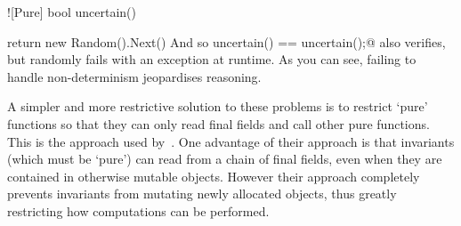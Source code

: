 \Q![Pure] bool uncertain() {return new Random().Next() %
And so \Q@assert uncertain() == uncertain();@ also verifies, but randomly fails with an exception at runtime.
As you can see, failing to handle non-determinism jeopardises reasoning.

A simpler and more restrictive solution to these problems is to restrict `pure' functions so that they can only read final fields and call other pure functions. This is the approach used by~\cite{Flanagan06hybridtypes}. One advantage of their approach is that invariants (which must be `pure') can read from a chain of final fields, even when they are contained in otherwise mutable objects. However their approach completely prevents invariants from mutating newly allocated objects, thus greatly restricting how computations can be performed.



















%
%
%
%



}
